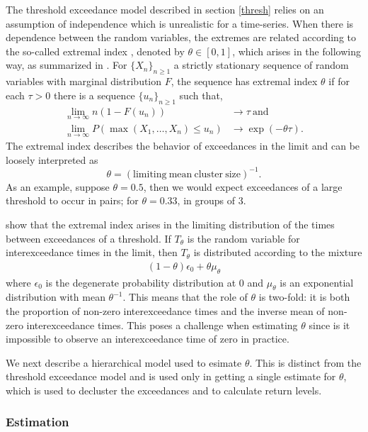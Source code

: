 The threshold exceedance model described in section \ref{thresh} relies on an assumption of independence which is unrealistic for a time-series. When there is dependence between the random variables, the extremes are related according to the so-called extremal index \citep{leadbetter1983extremes}, denoted by $\theta\in[0,1]$, which arises in the following way, as summarized in \cite{ferro2003inference}. For $\{X_n\}_{n\geq 1}$ a strictly stationary sequence of random variables with marginal distribution $F$, the sequence has extremal index $\theta$ if for each $\tau>0$ there is a sequence $\{u_n\}_{n\geq 1}$ such that,
\begin{align}
\lim_{n\rightarrow\infty} n(1-F(u_n)) &\rightarrow \tau \mathrm{~and~} \nonumber \\
\lim_{n\rightarrow\infty} P(\max(X_1,\ldots,X_n)\leq u_n) &\rightarrow \exp(-\theta\tau). \nonumber
\end{align}
The extremal index describes the behavior of exceedances in the limit and can be loosely interpreted as
\[ \theta = (\mathrm{limiting~mean~cluster~size})^{-1}. \]
As an example, suppose $\theta=0.5$, then we would expect exceedances of a large threshold to occur in pairs; for $\theta=0.33$, in groups of 3.

\cite{ferro2003inference} show that the extremal index arises in the limiting distribution of the times between exceedances of a threshold. If $T_\theta$ is the random variable for interexceedance times in the limit, then $T_\theta$ is distributed according to the mixture
\begin{align}
(1-\theta)\epsilon_0 + \theta \mu_\theta
\end{align}
where $\epsilon_0$ is the degenerate probability distribution at $0$ and $\mu_\theta$ is an exponential distribution with mean $\theta^{-1}$. This means that the role of $\theta$ is two-fold: it is both the proportion of non-zero interexceedance times and the inverse mean of non-zero interexceedance times. This poses a challenge when estimating $\theta$ since is it impossible to observe an interexceedance time of zero in practice.

We next describe a hierarchical model used to esimate $\theta$. This is distinct from the threshold exceedance model and is used only in getting a single estimate for $\theta$, which is used to decluster the exceedances and to calculate return levels.

\subsubsection{Estimation}

